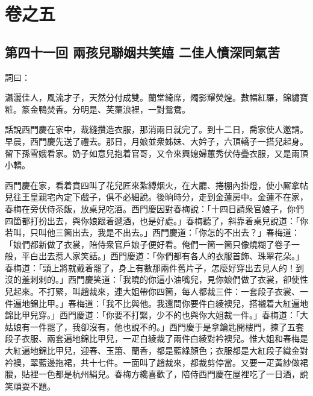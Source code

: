 \part*{{\titlename}卷之五}



\chapter*{第四十一回 兩孩兒聯姻共笑嬉 二佳人憤深同氣苦}


詞曰：

\begin{myquote}
瀟灑佳人，風流才子，天然分付成雙。蘭堂綺席，燭影耀熒煌。數幅紅羅，錦繡寶粧。篆金鴨焚香。分明是、芙蕖浪裡，一對鴛鴦。

\end{myquote}

話說西門慶在家中，裁縫攢造衣服，那消兩日就完了。到十二日，喬家使人邀請。早晨，西門慶先送了禮去。那日，月娘並衆姊妹、大妗子，六頂轎子一搭兒起身。留下孫雪娥看家。奶子如意兒抱着官哥，又令來興媳婦蕙秀伏侍疊衣服，又是兩頂小轎。

西門慶在家，看着賁四叫了花兒匠來紮縛烟火，在大廳、捲棚內掛燈，使小厮拿帖兒往王皇親宅內定下戲子，俱不必細說。後晌時分，走到金蓮房中。金蓮不在家，春梅在旁伏侍茶飯，放桌兒吃酒。西門慶因對春梅說：「十四日請衆官娘子，你們四箇都打扮出去，與你娘跟着遞酒，也是好處。」春梅聽了，斜靠着桌兒說道：「你若叫，只叫他三箇出去，我是不出去。」西門慶道：「你怎的不出去？」春梅道：「娘們都新做了衣裳，陪侍衆官戶娘子便好看。俺們一箇一箇只像燒糊了卷子一般，平白出去惹人家笑話。」西門慶道：「你們都有各人的衣服首飾、珠翠花朵。」春梅道：「頭上將就戴着罷了，身上有數那兩件舊片子，怎麼好穿出去見人的！到沒的羞剌剌的。」西門慶笑道：「我曉的你這小油嘴兒，見你娘們做了衣裳，卻使性兒起來。不打緊，叫趙裁來，連大姐帶你四箇，每人都裁三件：一套段子衣裳、一件遍地錦比甲。」春梅道：「我不比與他。我還問你要件白綾襖兒，搭襯着大紅遍地錦比甲兒穿。」{}西門慶道：「你要不打緊，少不的也與你大姐裁一件。」春梅道：「大姑娘有一件罷了，我卻沒有，他也說不的。」西門慶于是拿鑰匙開樓門，揀了五套段子衣服、兩套遍地錦比甲兒，一疋白綾裁了兩件白綾對衿襖兒。惟大姐和春梅是大紅遍地錦比甲兒，迎春、玉簫、蘭香，都是藍綠顏色；衣服都是大紅段子織金對衿襖，翠藍邊拖裙，共十七件。一面叫了趙裁來，都裁剪停當。又要一疋黃紗做裙腰，貼裡一色都是杭州絹兒。春梅方纔喜歡了，陪侍西門慶在屋裡吃了一日酒，說笑頑耍不題。

